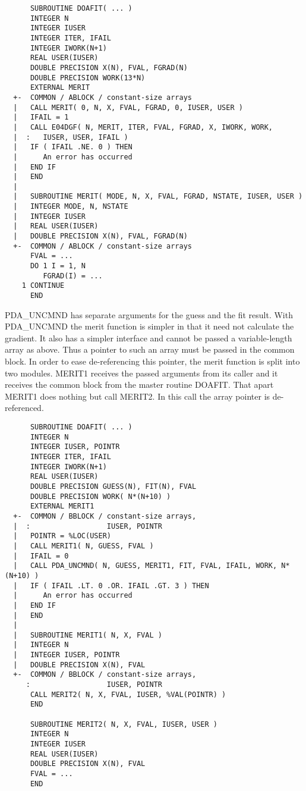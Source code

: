 \begin{verbatim}
      SUBROUTINE DOAFIT( ... )
      INTEGER N
      INTEGER IUSER
      INTEGER ITER, IFAIL
      INTEGER IWORK(N+1)
      REAL USER(IUSER)
      DOUBLE PRECISION X(N), FVAL, FGRAD(N)
      DOUBLE PRECISION WORK(13*N)
      EXTERNAL MERIT
  +-  COMMON / ABLOCK / constant-size arrays
  |   CALL MERIT( 0, N, X, FVAL, FGRAD, 0, IUSER, USER )
  |   IFAIL = 1
  |   CALL E04DGF( N, MERIT, ITER, FVAL, FGRAD, X, IWORK, WORK,
  |  :   IUSER, USER, IFAIL )
  |   IF ( IFAIL .NE. 0 ) THEN
  |      An error has occurred
  |   END IF
  |   END
  |
  |   SUBROUTINE MERIT( MODE, N, X, FVAL, FGRAD, NSTATE, IUSER, USER )
  |   INTEGER MODE, N, NSTATE
  |   INTEGER IUSER
  |   REAL USER(IUSER)
  |   DOUBLE PRECISION X(N), FVAL, FGRAD(N)
  +-  COMMON / ABLOCK / constant-size arrays
      FVAL = ...
      DO 1 I = 1, N
         FGRAD(I) = ...
    1 CONTINUE
      END
\end{verbatim}

   PDA\_UNCMND has separate arguments for the guess and the fit result.
   With PDA\_UNCMND the merit function is simpler in that it need not
   calculate the gradient. It also has a simpler interface and cannot be
   passed a variable-length array as above. Thus a pointer to such an
   array must be passed in the common block. In order to ease
   de-referencing this pointer, the merit function is split into two
   modules. MERIT1 receives the passed arguments from its caller and it
   receives the common block from the master routine DOAFIT. That apart
   MERIT1 does nothing but call MERIT2. In this call the array pointer
   is de-referenced.

\begin{verbatim}
      SUBROUTINE DOAFIT( ... )
      INTEGER N
      INTEGER IUSER, POINTR
      INTEGER ITER, IFAIL
      INTEGER IWORK(N+1)
      REAL USER(IUSER)
      DOUBLE PRECISION GUESS(N), FIT(N), FVAL
      DOUBLE PRECISION WORK( N*(N+10) )
      EXTERNAL MERIT1
  +-  COMMON / BBLOCK / constant-size arrays,
  |  :                  IUSER, POINTR
  |   POINTR = %LOC(USER)
  |   CALL MERIT1( N, GUESS, FVAL )
  |   IFAIL = 0
  |   CALL PDA_UNCMND( N, GUESS, MERIT1, FIT, FVAL, IFAIL, WORK, N*(N+10) )
  |   IF ( IFAIL .LT. 0 .OR. IFAIL .GT. 3 ) THEN
  |      An error has occurred
  |   END IF
  |   END
  |
  |   SUBROUTINE MERIT1( N, X, FVAL )
  |   INTEGER N
  |   INTEGER IUSER, POINTR
  |   DOUBLE PRECISION X(N), FVAL
  +-  COMMON / BBLOCK / constant-size arrays,
     :                  IUSER, POINTR
      CALL MERIT2( N, X, FVAL, IUSER, %VAL(POINTR) )
      END

      SUBROUTINE MERIT2( N, X, FVAL, IUSER, USER )
      INTEGER N
      INTEGER IUSER
      REAL USER(IUSER)
      DOUBLE PRECISION X(N), FVAL
      FVAL = ...
      END
\end{verbatim}


